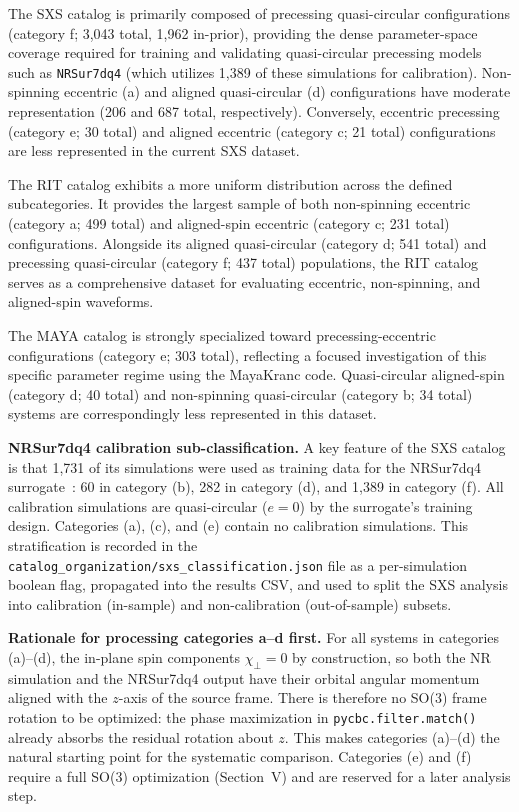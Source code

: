 \documentclass[%
 reprint,
superscriptaddress,
 amsmath,amssymb,
 aps,
]{revtex4-2}
\begin{document}
The SXS catalog is primarily composed of precessing quasi-circular configurations (category f; 3,043 total, 1,962 in-prior), providing the dense parameter-space coverage required for training and validating quasi-circular precessing models such as \texttt{NRSur7dq4} (which utilizes 1,389 of these simulations for calibration). Non-spinning eccentric (a) and aligned quasi-circular (d) configurations have moderate representation (206 and 687 total, respectively). Conversely, eccentric precessing (category e; 30 total) and aligned eccentric (category c; 21 total) configurations are less represented in the current SXS dataset.

The RIT catalog exhibits a more uniform distribution across the defined subcategories. It provides the largest sample of both non-spinning eccentric (category a; 499 total) and aligned-spin eccentric (category c; 231 total) configurations. Alongside its aligned quasi-circular (category d; 541 total) and precessing quasi-circular (category f; 437 total) populations, the RIT catalog serves as a comprehensive dataset for evaluating eccentric, non-spinning, and aligned-spin waveforms.

The MAYA catalog is strongly specialized toward precessing-eccentric configurations (category e; 303 total), reflecting a focused investigation of this specific parameter regime using the MayaKranc code. Quasi-circular aligned-spin (category d; 40 total) and non-spinning quasi-circular (category b; 34 total) systems are correspondingly less represented in this dataset.

\textbf{NRSur7dq4 calibration sub-classification.} A key feature of the SXS catalog is that 1,731 of its simulations were used as training data for the NRSur7dq4 surrogate~\cite{Varma:2019csw}: 60 in category (b), 282 in category (d), and 1,389 in category (f).  All calibration simulations are quasi-circular ($e = 0$) by the surrogate's training design.  Categories (a), (c), and (e) contain no calibration simulations.  This stratification is recorded in the \texttt{catalog\_organization/sxs\_classification.json} file as a per-simulation boolean flag, propagated into the results CSV, and used to split the SXS analysis into calibration (in-sample) and non-calibration (out-of-sample) subsets.

\textbf{Rationale for processing categories a–d first.} For all systems in categories (a)–(d), the in-plane spin components $\chi_\perp = 0$ by construction, so both the NR simulation and the NRSur7dq4 output have their orbital angular momentum aligned with the $z$-axis of the source frame.  There is therefore no SO(3) frame rotation to be optimized: the phase maximization in \texttt{pycbc.filter.match()} already absorbs the residual rotation about $z$.  This makes categories (a)–(d) the natural starting point for the systematic comparison.  Categories (e) and (f) require a full SO(3) optimization (Section~V) and are reserved for a later analysis step.
\end{document}
